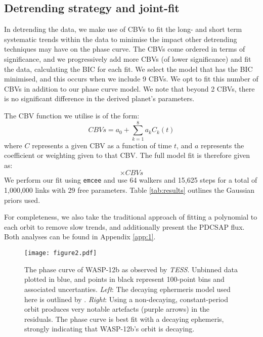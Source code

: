 \documentclass[fleqn,usenatbib]{mnras}
\begin{document}
\begin{table}
\end{table}


\subsection{Detrending strategy and joint-fit}
In detrending the data, we make use of CBVs to fit the long- and short term systematic trends within the data to minimise the impact other detrending techniques may have on the phase curve. The CBVs come ordered in terms of significance, and we progressively add more CBVs (of lower significance) and fit the data, calculating the BIC for each fit. We select the model that has the BIC minimised, and this occurs when we include 9 CBVs. We opt to fit this number of CBVs in addition to our phase curve model. We note that beyond 2 CBVs, there is no significant difference in the derived planet's parameters.

The CBV function we utilise is of the form:
\begin{equation}
    CBVs =  a_{0} + \sum_{k=1}^{8} a_{k} C_{k}(t)
\end{equation}
where $C$ represents a given CBV as a function of time $t$, and $a$ represents the coefficient or weighting given to that CBV. The full model fit is therefore given as:
\begin{equation}
     [F_{\mathrm{transit}}(\phi) \cdot (F_{\mathrm{m}}(\phi)+1) + F_{\mathrm{ecl}}(\phi) + F_{\mathrm{p}}(\phi + \theta)] \times CBVs
\end{equation}
We perform our fit using \texttt{emcee} \citep{emcee} and use 64 walkers and 15,625 steps for a total of 1,000,000 links with 29 free parameters. Table \ref{tab:results} outlines the Gaussian priors used.

For completeness, we also take the traditional approach of fitting a polynomial to each orbit to remove slow trends, and additionally present the PDCSAP flux. Both analyses can be found in Appendix \ref{app:1}.

\begin{figure*}
	\texttt{[image: figure2.pdf]}
    \caption{The phase curve of WASP-12b as observed by \textit{TESS}. Unbinned data plotted in blue, and points in black represent 100-point bins and associated uncertanties. \textit{Left}: The decaying ephermeris model used here is outlined by \citet{orbitdecay}. \textit{Right}: Using a non-decaying, constant-period orbit produces very notable artefacts (purple arrows) in the residuals. The phase curve is best fit with a decaying ephemeris, strongly indicating that WASP-12b's orbit is decaying.}
    \label{fig:figure2}
\end{figure*}
\end{document}
